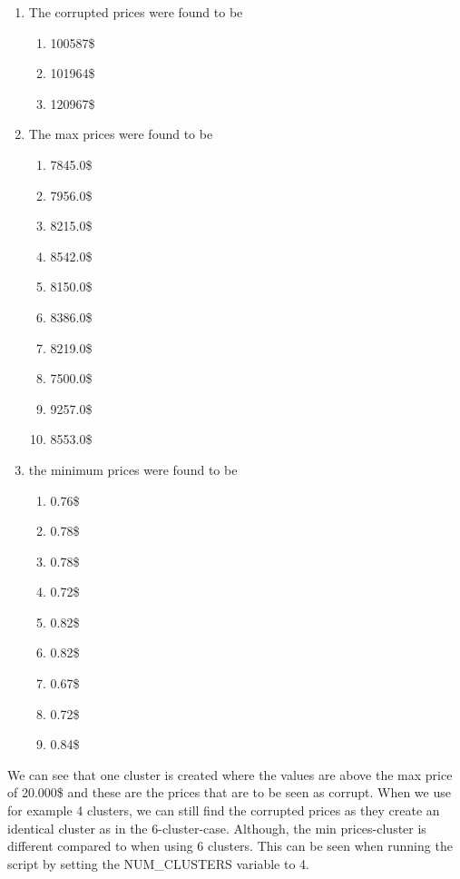 \documentclass{article}
\begin{document}
        \begin{enumerate}[label=(\alph*)]
            \item The corrupted prices were found to be 
            \begin{enumerate}
                \item 100587\$
                \item 101964\$
                \item 120967\$
            \end{enumerate}
            \item The max prices were found to be
            \begin{enumerate}
                \item 7845.0\$
                \item 7956.0\$
                \item 8215.0\$
                \item 8542.0\$
                \item 8150.0\$
                \item 8386.0\$
                \item 8219.0\$
                \item 7500.0\$
                \item 9257.0\$
                \item 8553.0\$
            \end{enumerate}
            \item the minimum prices were found to be
            \begin{enumerate}
	            \item 0.76\$
            	\item 0.78\$
            	\item 0.78\$
            	\item 0.72\$
            	\item 0.82\$
            	\item 0.82\$
            	\item 0.67\$
            	\item 0.72\$
            	\item 0.84\$
            \end{enumerate}
        \end{enumerate}
        We can see that one cluster is created where the values are above the max price of 20.000\$ and these are the prices that are to be seen as corrupt. When we use for example 4 clusters, we can still find the corrupted prices as they create an identical cluster as in the 6-cluster-case. Although, the min prices-cluster is different compared to when using 6 clusters. This can be seen when running the script by setting the NUM\_CLUSTERS variable to 4.
\end{document}
